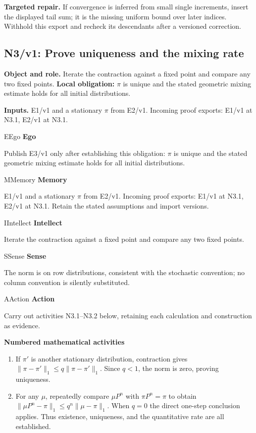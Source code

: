 \documentclass[preprint,12pt,aps,pra,showkeys,amsmath,amssymb,superscriptaddress,floatfix]{revtex4-2}
\theoremstyle{definition}
\theoremstyle{remark}
\newcommand{\mmfaculty}[3]{%
 \begin{mmfacultybox}{#1}{#2}
 {\sffamily\bfseries\color{MMBlue}#2}\par\smallskip #3
 \end{mmfacultybox}}
\newcommand{\field}[2]{\par\smallskip\noindent\textbf{#1.} #2\par}
\begin{document}
\field{Targeted repair}{If convergence is inferred from small single increments, insert the
displayed tail sum; it is the missing uniform bound over later indices.
Withhold this export and recheck its descendants after a versioned
correction.}

\clearpage

\subsection{N3/v1: Prove uniqueness and the mixing rate}

\field{Object and role}{Iterate the contraction against a fixed point and compare any two fixed
points. \textbf{Local obligation:} \(\pi\) is unique and the stated
geometric mixing estimate holds for all initial distributions.}

\field{Inputs}{E1/v1 and a stationary \(\pi\) from E2/v1. Incoming proof exports: E1/v1
at N3.1, E2/v1 at N3.1.}

\mmfaculty{E}{Ego}{Publish E3/v1 only after establishing this obligation: \(\pi\) is unique
and the stated geometric mixing estimate holds for all initial
distributions.}

\mmfaculty{M}{Memory}{E1/v1 and a stationary \(\pi\) from E2/v1. Incoming proof exports: E1/v1
at N3.1, E2/v1 at N3.1. Retain the stated assumptions and import
versions.}

\mmfaculty{I}{Intellect}{Iterate the contraction against a fixed point and compare any two fixed
points.}

\mmfaculty{S}{Sense}{The norm is on row distributions, consistent with the stochastic
convention; no column convention is silently substituted.}

\mmfaculty{A}{Action}{Carry out activities N3.1--N3.2 below, retaining each calculation and
construction as evidence.}

\smallskip\noindent\textbf{Numbered mathematical activities}

\begin{enumerate}[label=N3.\arabic*,leftmargin=3.4em]

\item If \(\pi'\) is another stationary distribution, contraction gives
\(\|\pi-\pi'\|_1\le q\|\pi-\pi'\|_1\). Since \(q<1\), the norm is zero,
proving uniqueness.

\item For any \(\mu\), repeatedly compare \(\mu P^n\) with \(\pi P^n=\pi\) to
obtain \(\|\mu P^n-\pi\|_1\le q^n\|\mu-\pi\|_1\). When \(q=0\) the
direct one-step conclusion applies. Thus existence, uniqueness, and the
quantitative rate are all established.

\end{enumerate}
\end{document}

